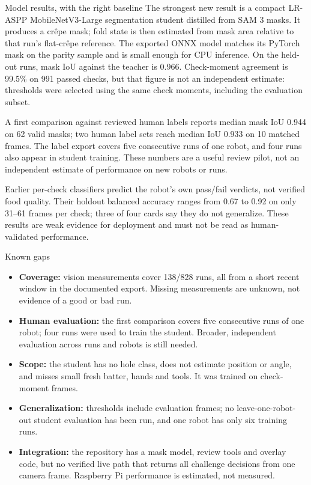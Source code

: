 \documentclass[10pt,a4paper]{article}
\makeatletter
\renewcommand\section{\@startsection{section}{1}{0pt}{9pt}{5pt}%
  {\normalfont\large\bfseries\color{ink}}}
\makeatother
\begin{document}
\section{Model results, with the right baseline}
The strongest new result is a compact LR-ASPP MobileNetV3-Large segmentation
student distilled from SAM 3 masks. It produces a cr\^epe mask; fold state is
then estimated from mask area relative to that run's flat-cr\^epe reference.
The exported ONNX model matches its PyTorch mask on the parity sample and is
small enough for CPU inference. On the held-out runs, mask IoU against the
teacher is 0.966. Check-moment agreement is 99.5\% on 991 passed checks, but
that figure is not an independent estimate: thresholds were selected using the
same check moments, including the evaluation subset.

A first comparison against reviewed human labels reports median mask IoU 0.944
on 62 valid masks; two human label sets reach median IoU 0.933 on 10 matched
frames. The label export covers five consecutive runs of one robot, and four
runs also appear in student training. These numbers are a useful review pilot,
not an independent estimate of performance on new robots or runs.

Earlier per-check classifiers predict the robot's own pass/fail verdicts, not
verified food quality. Their holdout balanced accuracy ranges from 0.67 to
0.92 on only 31--61 frames per check; three of four cards say they do not
generalize. These results are weak evidence for deployment and must not be
read as human-validated performance.

\section{Known gaps}
\begin{itemize}
  \item \textbf{Coverage:} vision measurements cover 138/828 runs, all from a
  short recent window in the documented export. Missing measurements are
  unknown, not evidence of a good or bad run.
  \item \textbf{Human evaluation:} the first comparison covers five
  consecutive runs of one robot; four runs were used to train the student.
  Broader, independent evaluation across runs and robots is still needed.
  \item \textbf{Scope:} the student has no hole class, does not estimate
  position or angle, and misses small fresh batter, hands and tools. It was
  trained on check-moment frames.
  \item \textbf{Generalization:} thresholds include evaluation frames; no
  leave-one-robot-out student evaluation has been run, and one robot has only
  six training runs.
  \item \textbf{Integration:} the repository has a mask model, review tools and
  overlay code, but no verified live path that returns all challenge decisions
  from one camera frame. Raspberry Pi performance is estimated, not measured.
\end{itemize}
\end{document}
